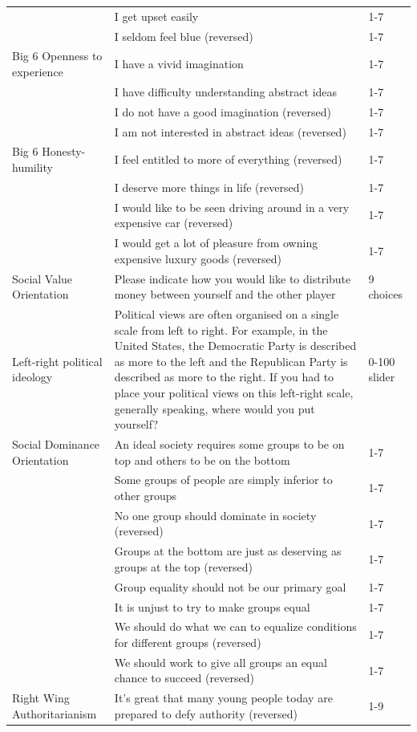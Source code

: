 \documentclass[
  english,
  man, donotrepeattitle,floatsintext]{apa6}
\newenvironment{lltable}{\begin{landscape}\centering\begin{ThreePartTable}}{\end{ThreePartTable}\end{landscape}}
\begin{document}
\begin{lltable}
{\begin{longtable}{p{6cm}p{11cm}p{3cm}}
 & I get upset easily & 1-7\\
 & I seldom feel blue (reversed) & 1-7\\
Big 6 Openness to experience & I have a vivid imagination & 1-7\\
 & I have difficulty understanding abstract ideas & 1-7\\
 & I do not have a good imagination (reversed) & 1-7\\
 & I am not interested in abstract ideas (reversed) & 1-7\\
Big 6 Honesty-humility & I feel entitled to more of everything (reversed) & 1-7\\
 & I deserve more things in life (reversed) & 1-7\\
 & I would like to be seen driving around in a very expensive car (reversed) & 1-7\\
 & I would get a lot of pleasure from owning expensive luxury goods (reversed) & 1-7\\
Social Value Orientation & Please indicate how you would like to distribute money between yourself and the other player & 9 choices\\
Left-right political ideology & Political views are often organised on a single scale from left to right. For example, in the United States, the Democratic Party is described as more to the left and the Republican Party is described as more to the right. If you had to place your political views on this left-right scale, generally speaking, where would you put yourself? & 0-100 slider\\
Social Dominance Orientation & An ideal society requires some groups to be on top and others to be on the bottom & 1-7\\
 & Some groups of people are simply inferior to other groups & 1-7\\
 & No one group should dominate in society (reversed) & 1-7\\
 & Groups at the bottom are just as deserving as groups at the top (reversed) & 1-7\\
 & Group equality should not be our primary goal & 1-7\\
 & It is unjust to try to make groups equal & 1-7\\
 & We should do what we can to equalize conditions for different groups (reversed) & 1-7\\
 & We should work to give all groups an equal chance to succeed (reversed) & 1-7\\
Right Wing Authoritarianism & It's great that many young people today are prepared to defy authority (reversed) & 1-9\\

\end{longtable}}
\end{lltable}
\end{document}
